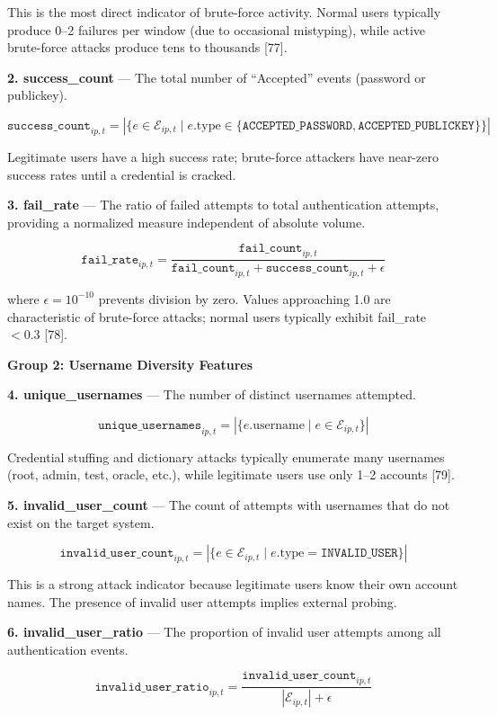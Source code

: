 \documentclass[
  a4paper]{report}
\begin{document}
This is the most direct indicator of brute-force activity. Normal users
typically produce 0--2 failures per window (due to occasional
mistyping), while active brute-force attacks produce tens to thousands
{[}77{]}.

\textbf{2. success\_count} --- The total number of ``Accepted'' events
(password or publickey).

\[\texttt{success\_count}_{ip,t} = |\{e \in \mathcal{E}_{ip,t} \mid e.\text{type} \in \{\texttt{ACCEPTED\_PASSWORD}, \texttt{ACCEPTED\_PUBLICKEY}\}\}|\]

Legitimate users have a high success rate; brute-force attackers have
near-zero success rates until a credential is cracked.

\textbf{3. fail\_rate} --- The ratio of failed attempts to total
authentication attempts, providing a normalized measure independent of
absolute volume.

\[\texttt{fail\_rate}_{ip,t} = \frac{\texttt{fail\_count}_{ip,t}}{\texttt{fail\_count}_{ip,t} + \texttt{success\_count}_{ip,t} + \epsilon}\]

where \(\epsilon = 10^{-10}\) prevents division by zero. Values
approaching 1.0 are characteristic of brute-force attacks; normal users
typically exhibit fail\_rate \(< 0.3\) {[}78{]}.

\textbf{Group 2: Username Diversity Features}

\textbf{4. unique\_usernames} --- The number of distinct usernames
attempted.

\[\texttt{unique\_usernames}_{ip,t} = |\{e.\text{username} \mid e \in \mathcal{E}_{ip,t}\}|\]

Credential stuffing and dictionary attacks typically enumerate many
usernames (root, admin, test, oracle, etc.), while legitimate users use
only 1--2 accounts {[}79{]}.

\textbf{5. invalid\_user\_count} --- The count of attempts with
usernames that do not exist on the target system.

\[\texttt{invalid\_user\_count}_{ip,t} = |\{e \in \mathcal{E}_{ip,t} \mid e.\text{type} = \texttt{INVALID\_USER}\}|\]

This is a strong attack indicator because legitimate users know their
own account names. The presence of invalid user attempts implies
external probing.

\textbf{6. invalid\_user\_ratio} --- The proportion of invalid user
attempts among all authentication events.

\[\texttt{invalid\_user\_ratio}_{ip,t} = \frac{\texttt{invalid\_user\_count}_{ip,t}}{|\mathcal{E}_{ip,t}| + \epsilon}\]
\end{document}
